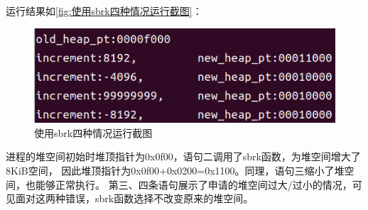 运行结果如\autoref{fig:使用sbrk四种情况运行截图}：

\begin{figure}[htb]
    \centering
    \includegraphics[width=\textwidth]{figures/03-01-使用sbrk四种情况运行截图.png}
    \caption{
        使用sbrk四种情况运行截图
    }
    \label{fig:使用sbrk四种情况运行截图}
\end{figure}

进程的堆空间初始时堆顶指针为0x0f00，语句二调用了sbrk函数，为堆空间增大了8KiB空间，
因此堆顶指针为0x0f00+0x0200=0x1100。同理，语句三缩小了堆空间，也能够正常执行。
第三、四条语句展示了申请的堆空间过大/过小的情况，可见面对这两种错误，sbrk函数选择不改变原来的堆空间。